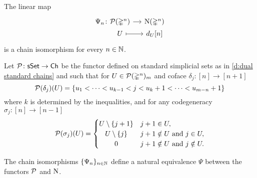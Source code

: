 \begin{lemma}
	The linear map
	\[
	\begin{tikzcd} [column sep=small, row sep=0]
	\Psi_n \colon &[-20pt] \cP(\simplex^n) \arrow[r] & \chains(\simplex^n) \\
	& U \arrow[r, mapsto] & d_U [n]
	\end{tikzcd}
	\]
	is a chain isomorphism for every $n \in \mathbb{N}$.
\end{lemma}

\iffalse
\begin{proof}
	It can be easily seen that $\Psi_n$ induces a degree preserving bijection of basis elements.
	We will verify that this assignment induces a chain map.
	Let $U = \{u_1 < \cdots < u_{n-m}\} \in \rP_{m-n}^n$.
	Using the relation $d_jd_u = d_ud_{j+1}$ if $u \leq j$ we have
	\begin{align*}
	\bd \Psi_n(U) &=
	\bd d_U[n] =
	\sum_{j=0}^{m} d_j\, d_{u_1} \cdots\, d_{u_{n-m}}[n] \\ &=
	\sum_{\bar u \in \{0, \dots, n\} \setminus U}
	\hspace*{-10pt} d_{u_1} \cdots\, d_{\bar{u}} \cdots\, d_{u_{n-m}}[n] \\ &=
	\sum_{\bar u \in \{0, \dots, n\} \setminus U} d_{\{\bar u\} \union U}[n] \\ &=
	\Psi_n(\bd U),
	\end{align*}
	as claimed.
\end{proof}
\fi

\begin{definition}
	Let $\mathcal{P} \colon \mathsf{sSet} \to \mathsf{Ch}$ be the functor defined on standard simplicial sets as in \cref{d:dual standard chains} and such that for $U \in \mathcal{P}(\mathbb{\Delta}^n)_m$ and coface $\delta_j \colon [n] \to [n+1]$
	\[
	\mathcal{P}(\delta_j)(U) = \{ u_1 < \dots < u_{k-1} < j < u_k+1 < \dots < u_{m-n}+1 \}
	\]
	where $k$ is determined by the inequalities, and for any codegeneracy $\sigma_j \colon [n] \to [n-1]$
	\begin{equation} \label{e:action of P on a codegeneracy}
	\cP(\sigma_j)(U) = \begin{cases}
	U \setminus \{j+1\} & j+1 \in U, \\
	\hfil U \setminus \{j\} & j+1 \notin U \text{ and } j \in U, \\
	\hfil 0 & j+1 \notin U \text{ and } j \notin U.
	\end{cases}
	\end{equation}
\end{definition}

\begin{lemma} \label{l:natural equivalence P and N}
	The chain isomorphisms $\{\Psi_n\}_{n \in \mathbb{N}}$ define a natural equivalence $\Psi$ between the functors $\mathcal{P}$ and $\operatorname{N}$.
\end{lemma}


